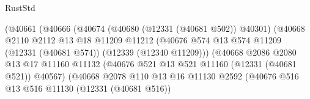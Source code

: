 \begin{lexlean}{RustStd}
\begin{coremodule}
                                        (@40661
                                          (@40666
                                            (@40674
                                              (@40680 (@12331 (@40681 @502)) @40301)
                                              (@40668
                                                @2110
                                                @2112
                                                @13
                                                @18
                                                @11209
                                                @11212
                                                (@40676
                                                  @574
                                                  @13
                                                  @574
                                                  @11209
                                                  (@12331 (@40681 @574))
                                                  (@12339 (@12340 @11209)))
                                                (@40668
                                                  @2086
                                                  @2080
                                                  @13
                                                  @17
                                                  @11160
                                                  @11132
                                                  (@40676
                                                    @521
                                                    @13
                                                    @521
                                                    @11160
                                                    (@12331 (@40681 @521))
                                                    @40567)
                                                  (@40668
                                                    @2078
                                                    @110
                                                    @13
                                                    @16
                                                    @11130
                                                    @2592
                                                    (@40676
                                                      @516
                                                      @13
                                                      @516
                                                      @11130
                                                      (@12331 (@40681 @516))

\end{coremodule}
\end{lexlean}
